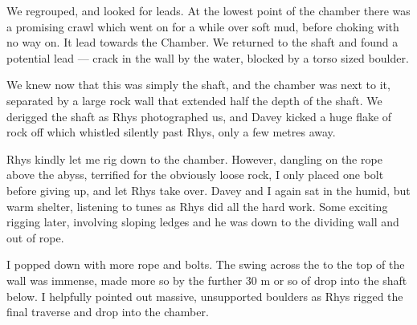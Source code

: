 We regrouped, and looked for leads. At the lowest point of the chamber there was a promising crawl which went on for a while over soft mud, before choking with no way on. It lead towards the  Chamber. We returned to the shaft and found a potential lead --- crack in the wall by the water, blocked by a torso sized boulder.

We knew now that this was simply the shaft, and the chamber was next to it, separated by a large rock wall that extended half the depth of the shaft. We derigged the shaft as Rhys photographed us, and Davey kicked a huge flake of rock off which whistled silently past Rhys, only a few metres away. 

Rhys kindly let me rig down to the  chamber. However, dangling on the rope above the abyss, terrified for the obviously loose rock, I only placed one bolt before giving up, and let Rhys take over. Davey and I again sat in the humid, but warm shelter, listening to tunes as Rhys did all the hard work. Some exciting rigging later, involving sloping ledges and he was down to the dividing wall and out of rope.

I popped down with more rope and bolts. The swing across the to the top of the wall was immense, made more so by the further 30 m or so of drop into the shaft below. I helpfully pointed out massive, unsupported boulders as Rhys rigged the final traverse and drop into the chamber.


